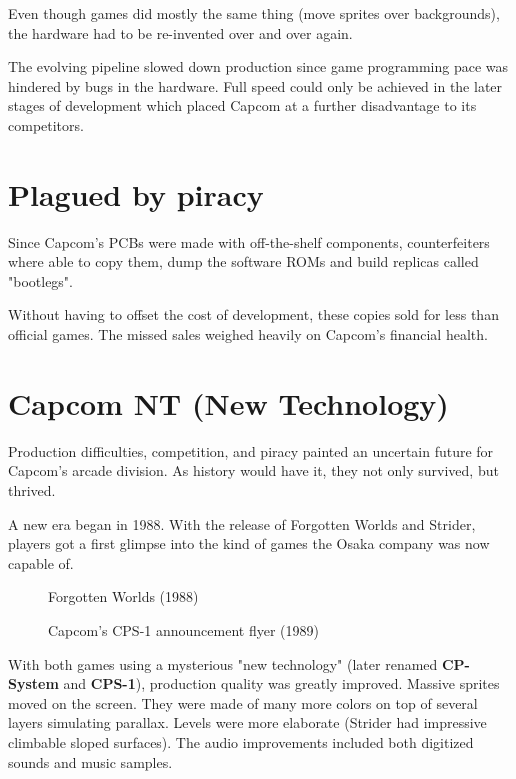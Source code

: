 Even though games did mostly the same thing (move sprites over backgrounds), the hardware had to be re-invented over and over again. 

The evolving pipeline slowed down production since game programming pace was hindered by bugs in the hardware. Full speed could only be achieved in the later stages of development which placed Capcom at a further disadvantage to its competitors.





\section{Plagued by piracy}
Since Capcom's PCBs were made with off-the-shelf components, counterfeiters where able to copy them, dump the software ROMs and build replicas called "bootlegs". 

Without having to offset the cost of development, these copies sold for less than official games. The missed sales weighed heavily on Capcom's financial health. 




\section{Capcom NT (New Technology)}
Production difficulties, competition, and piracy painted an uncertain future for Capcom's arcade division. As history would have it, they not only survived, but thrived.

A new era began in 1988. With the release of Forgotten Worlds and Strider, players got a first glimpse into the kind of games the Osaka company was now capable of.  



\label{nin_fw}
\begin{figure}[H]
\caption*{Forgotten Worlds (1988)}
\end{figure}



 
\label{fw_flyer}
  \begin{figure}[H]
  \caption*{Capcom's CPS-1 announcement flyer (1989)}
  \end{figure}

With both games using a mysterious "new technology" (later renamed \textbf{CP-System} and \textbf{CPS-1}), production quality was greatly improved. Massive sprites moved on the screen. They were made of many more colors on top of several layers simulating parallax. Levels were more elaborate (Strider had impressive climbable sloped surfaces). The audio improvements included both digitized sounds and music samples.

